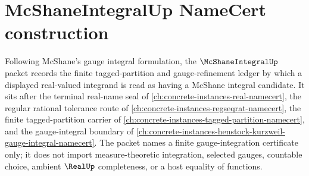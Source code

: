 \chapter{McShaneIntegralUp NameCert construction}
\label{ch:concrete-instances-mcshane-integral-namecert}

Following McShane's gauge integral formulation, the $\McShaneIntegralUp$ packet records the finite tagged-partition and gauge-refinement ledger by which a displayed real-valued integrand is read as having a McShane integral candidate. It sits after the terminal real-name seal of \autoref{ch:concrete-instances-real-namecert}, the regular rational tolerance route of \autoref{ch:concrete-instances-regseqrat-namecert}, the finite tagged-partition carrier of \autoref{ch:concrete-instances-tagged-partition-namecert}, and the gauge-integral boundary of \autoref{ch:concrete-instances-henstock-kurzweil-gauge-integral-namecert}. The packet names a finite gauge-integration certificate only; it does not import measure-theoretic integration, selected gauges, countable choice, ambient $\RealUp$ completeness, or a host equality of functions.

